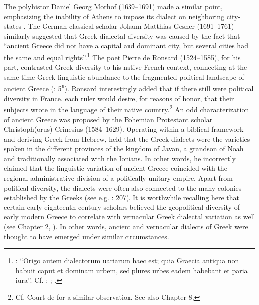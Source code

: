 The polyhistor Daniel Georg Morhof (1639–1691) made a similar point, emphasizing the inability of Athens to impose its dialect on neighboring city-states \citep[146]{Morhof1685}. The German classical scholar Johann Matthias Gesner (1691–1761) similarly suggested that Greek dialectal diversity was caused by the fact that “ancient Greece did not have a capital and dominant city, but several cities had the same and equal rights”.\footnote{\citet[160--161]{Gesner1174}: “Origo autem dialectorum uariarum haec est; quia Graecia antiqua non habuit caput et dominam urbem, sed plures urbes eadem habebant et paria iura”. Cf. \citet[395--396]{Rollin1731}; \citet[136--138]{Priestley1762}; \citet[204]{Ries1786}.} The poet Pierre de Ronsard (1524–1585), for his part, contrasted Greek diversity to his native French context, connecting at the same time Greek linguistic abundance to the fragmented political landscape of ancient Greece (\citealt{Ronsard1565}: 5\textsc{\textsuperscript{r}}). Ronsard interestingly added that if there still were political diversity in France, each ruler would desire, for reasons of honor, that their subjects wrote in the language of their native country.\footnote{Cf. Court de \citet[lxviii]{Court1778} for a similar observation. See also Chapter 8, } An odd characterization of ancient Greece was proposed by the Bohemian Protestant scholar Christoph(orus) Crinesius (1584–1629). Operating within a biblical framework and deriving Greek from Hebrew, \citet[77]{Crinesius1629} held that the Greek dialects were the varieties spoken in the different provinces of the kingdom of Javan, a grandson of Noah and traditionally associated with the Ionians. In other words, he incorrectly claimed that the linguistic variation of ancient Greece coincided with the regional-administrative division of a politically unitary empire. Apart from political diversity, the dialects were often also connected to the many colonies established by the Greeks (see e.g. \citealt{Simonis1752}: 207). It is worthwhile recalling here that certain early eighteenth-century scholars believed the geopolitical diversity of early modern Greece to correlate with vernacular Greek dialectal variation as well (see Chapter 2, ). In other words, ancient and vernacular dialects of Greek were thought to have emerged under similar circumstances.


